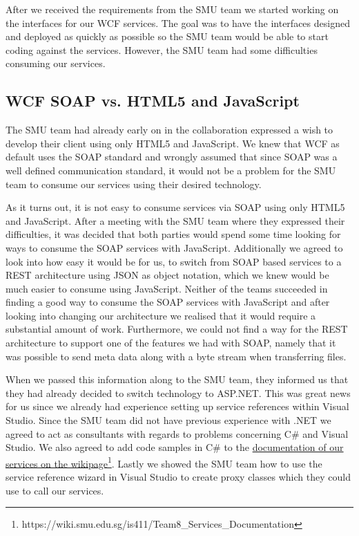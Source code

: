 \documentclass[../report.tex]{subfiles}
\begin{document}
After we received the requirements from the SMU team we started working on the interfaces for our WCF services. 
The goal was to have the interfaces designed and deployed as quickly as possible so the SMU team would be able to start coding against the services.
However, the SMU team had some difficulties consuming our services.
\subsection{WCF SOAP vs. HTML5 and JavaScript}
The SMU team had already early on in the collaboration expressed a wish to develop their client using only HTML5 and JavaScript. 
We knew that WCF as default uses the SOAP standard and wrongly assumed that since SOAP was a well defined communication standard, it would not be a problem for the SMU team to consume our services using their desired technology.

As it turns out, it is not easy to consume services via SOAP using only HTML5 and JavaScript.
After a meeting with the SMU team where they expressed their difficulties, it was decided that both parties would spend some time looking for ways to consume the SOAP services with JavaScript.
Additionally we agreed to look into how easy it would be for us, to switch from SOAP based services to a REST architecture using JSON as object notation, which we knew would be much easier to consume using JavaScript.
Neither of the teams succeeded in finding a good way to consume the SOAP services with JavaScript and after looking into changing our architecture we realised that it would require a substantial amount of work.
Furthermore, we could not find a way for the REST architecture to support one of the features we had with SOAP, namely that it was possible to send meta data along with a byte stream when transferring files.

When we passed this information along to the SMU team, they informed us that they had already decided to switch technology to ASP.NET.
This was great news for us since we already had experience setting up service references within Visual Studio.
Since the SMU team did not have previous experience with .NET we agreed to act as consultants with regards to problems concerning C\# and Visual Studio.
We also agreed to add code samples in C\# to the \href{https://wiki.smu.edu.sg/is411/Team8\_Services\_Documentation}{documentation of our services on the wikipage}\footnote{https://wiki.smu.edu.sg/is411/Team8\_Services\_Documentation}.
Lastly we showed the SMU team how to use the service reference wizard in Visual Studio to create proxy classes which they could use to call our services.
\end{document}
